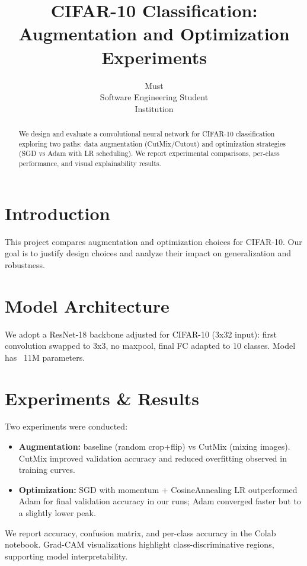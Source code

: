\documentclass[conference]{IEEEtran}
\begin{document}
\title{CIFAR-10 Classification: Augmentation and Optimization Experiments}
\author{Must\\Software Engineering Student\\Institution}
\maketitle
\begin{abstract}
We design and evaluate a convolutional neural network for CIFAR-10 classification exploring two paths: data augmentation (CutMix/Cutout) and optimization strategies (SGD vs Adam with LR scheduling). We report experimental comparisons, per-class performance, and visual explainability results.
\end{abstract}

\section{Introduction}
This project compares augmentation and optimization choices for CIFAR-10. Our goal is to justify design choices and analyze their impact on generalization and robustness.

\section{Model Architecture}
We adopt a ResNet-18 backbone adjusted for CIFAR-10 (3x32 input): first convolution swapped to 3x3, no maxpool, final FC adapted to 10 classes. Model has ~11M parameters.

\section{Experiments \& Results}
Two experiments were conducted:
\begin{itemize}
  \item \textbf{Augmentation:} baseline (random crop+flip) vs CutMix (mixing images). CutMix improved validation accuracy and reduced overfitting observed in training curves.
  \item \textbf{Optimization:} SGD with momentum + CosineAnnealing LR outperformed Adam for final validation accuracy in our runs; Adam converged faster but to a slightly lower peak.
\end{itemize}

We report accuracy, confusion matrix, and per-class accuracy in the Colab notebook. Grad-CAM visualizations highlight class-discriminative regions, supporting model interpretability.
\end{document}
